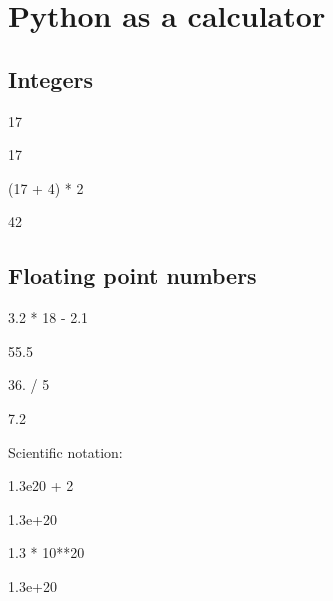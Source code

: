 \documentclass[slidestop]{beamer}
\begin{document}

\section{Python as a calculator}

\subsection{Integers}
\begin{pframe}
 \begin{pyin}
17
 \end{pyin}
 \begin{pyout}
17
 \end{pyout}
 \begin{pyin}
(17 + 4) * 2
 \end{pyin}
 \begin{pyout}
42
 \end{pyout}
\end{pframe}

\subsection{Floating point numbers}
\begin{pframe}
 \begin{pyin}
3.2 * 18 - 2.1
 \end{pyin}
 \begin{pyout}
55.5
 \end{pyout}
 \begin{pyin}
36. / 5
 \end{pyin}
 \begin{pyout}
7.2
 \end{pyout}

Scientific notation:
 \begin{pyin}
1.3e20 + 2
 \end{pyin}
 \begin{pyout}
1.3e+20
 \end{pyout}
 \begin{pyin}
1.3 * 10**20
 \end{pyin}
 \begin{pyout}
1.3e+20
 \end{pyout}

\end{pframe}
\end{document}
